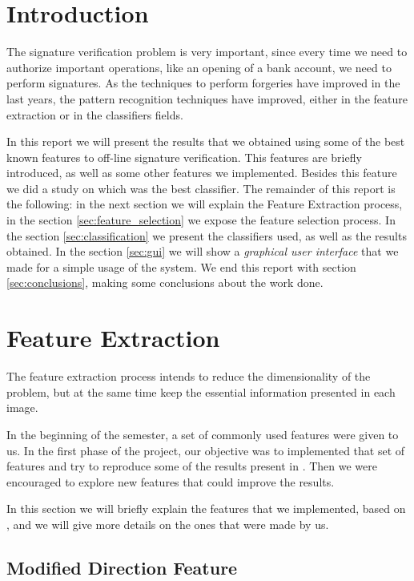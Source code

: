 \documentclass[12pt,a4paper]{report}
\begin{document}
	
	\tableofcontents
	\listoffigures
		\chapter{Introduction}
		The signature verification problem is very important, since every time we need to authorize important operations, like an opening of a bank account, we need to perform signatures. As the techniques to perform forgeries have improved in the last years, the pattern recognition techniques have improved, either in the feature extraction or in the classifiers fields.

		In this report we will present the results that we obtained using some of the best known features to off-line signature verification. This features are briefly introduced, as well as some other features we implemented. Besides this feature we did a study on which was the best classifier.
		The remainder of this report is the following: in the next section we will explain the Feature Extraction process, in the section \ref{sec:feature_selection} we expose the feature selection process. In the section \ref{sec:classification} we present the classifiers used, as well as the results obtained. In the section \ref{sec:gui} we will show a \emph{graphical user interface} that we made for a simple usage of the system. We end this report with section \ref{sec:conclusions}, making some conclusions about the work done.
		
		\chapter{Feature Extraction}
		 The feature extraction process intends to reduce the dimensionality of the problem, but at the same time keep the essential information presented in each image.
		
		In the beginning of the semester, a set of commonly used features were given to us. In the first phase of the project, our objective was to implemented that set of features and try to reproduce some of the results present in \cite{armand07}. Then we were encouraged to explore new features that could improve the results.
		
		In this section we will briefly explain the features that we implemented, based on \cite{armand07}, and we will give more details on the ones that were made by us.
		
		\section{Modified Direction Feature}
		
\end{document}

